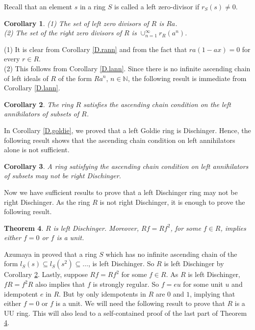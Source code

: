\documentclass[12pt]{article}
\makeatletter
\theoremstyle{plain}
\newtheorem{thm}{Theorem}[section]
\newtheorem{cor}[thm]{Corollary}
\theoremstyle{definition}
\renewenvironment{proof}[1][\proofname]{%
	\par\pushQED{\qed}%
	\normalfont %
	\topsep6\p@\@plus6\p@\relax
	\trivlist
	\item[\hskip\labelsep\bfseries #1\@addpunct{.}]%
}{%
	\popQED\endtrivlist\@endpefalse
}
\renewcommand{\proofname}{Proof}
\makeatother
\begin{document}
	Recall that an element $s$ in a ring $S$ is called a left zero-divisor if $r_S(s) \neq 0$.
	\begin{cor}\label{D.zerodivisors}
		\textup{(1)} The set of left zero divisors of $R$ is $Ra$.\\[2mm]
		\textup{(2)} The set of the right zero divisors of $R$ is $\cup_{n = 1}^{\infty} r_R(a^n)$.
	\end{cor}
	\begin{proof}
		(1) It is clear from Corollary \ref{D.rann} and from the fact that $ra(1-ax) = 0$ for every $r \in R$.\\[3mm]
		(2) This follows from Corollary \ref{D.lann}.
	\end{proof}
	Since there is no infinite ascending chain of left ideals of $R$ of the form $Ra^n$, $n\in \mathbb{N}$, the following result is immediate from Corollary \ref{D.lann}. 
	\begin{cor}\label{D.acc}
		The ring $R$ satisfies the ascending chain condition on the left annihilators of subsets of $R$.
	\end{cor}
	In Corollary \ref{D.goldie}, we proved that a left Goldie ring is Dischinger. Hence, the following result shows that the ascending chain condition on left annihilators alone is not sufficient.
	\begin{cor}\label{D.azacc}
		A ring satisfying the ascending chain condition on left annihilators of subsets may not be right Dischinger.
	\end{cor}
	Now we have sufficient results to prove that a left Dischinger ring may not be right Dischinger. As the ring $R$ is not right Dischinger, it is enough to prove the following result.
	\begin{thm}\label{D.symm}
		$R$ is left Dischinger. Moreover, $Rf = Rf^2$, for some $f\in R$, implies either $f = 0$ or $f$ is a unit.
	\end{thm}
	\begin{proof}
		Azumaya in \cite[Theorem 2]{Az} proved that a ring $S$ which has no infinite ascending chain of the form $l_S(s) \subseteq l_S(s^2) \subseteq \ldots$, is left Dischinger. So $R$ is left Dischinger by Corollary \ref{D.acc}. Lastly, suppose $Rf = Rf^2$ for some $f \in R$. As $R$ is left Dischinger, $fR = f^2R$ also implies that $f$ is strongly regular. So $f = eu$ for some unit $u$ and idempotent $e$ in $R$. But by \cite[Theorem 2.3]{Dit} only idempotents in $R$ are $0$ and $1$, implying that either $f=0$ or $f$ is a unit. 
	\end{proof}
	We will need the following result to prove that $R$ is a UU ring. This will also lead to a self-contained proof of the last part of Theorem \ref{D.symm}.
\end{document}
